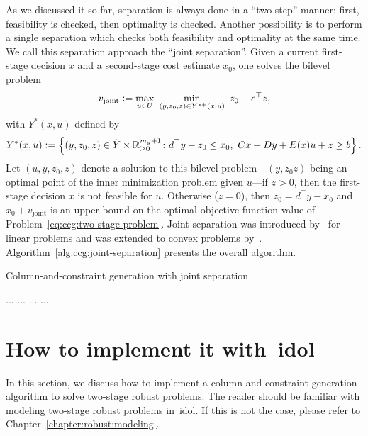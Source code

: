 As we discussed it so far, separation is always done in a ``two-step'' manner:
first, feasibility is checked, then optimality is checked. Another possibility
is to perform a single separation which checks both feasibility and optimality
at the same time. We call this separation approach the ``joint separation''.
Given a current first-stage decision $x$ and a second-stage cost estimate
$x_0$, one solves the bilevel problem 
\begin{equation*}
    v_\text{joint} \define \max_{u\in U} \ \min_{(y,z_0,z)\in Y^{*+}(x,u)} \ { z_0 + e^\top z },
\end{equation*}
with $Y^{*}(x,u)$ defined by
\begin{equation*}
    Y^{*}(x,u) \mathrel{{\mathop:}{=}} \left\{ (y,z_0,z)\in\tilde{Y}\times\mathbb{R}^{m_y+1}_{\ge 0} \colon d^\top y - z_0 \le x_0, \ Cx + Dy + E(x)u + z \ge b\right\}.
\end{equation*}
Let $(u,y,z_0,z)$ denote a solution to this bilevel problem---$(y,z_0z)$ being
an optimal point of the inner minimization problem given $u$---if $z > 0$,
then the first-stage decision $x$ is not feasible for $u$. Otherwise ($z=0$),
then $z_0 = d^\top y - x_0$ and $x_0 + v_\text{joint}$ is an upper bound on
the optimal objective function value of
Problem~\eqref{eq:ccg:two-stage-problem}. Joint separation was introduced
by~\textcite{Ayoub2016} for linear problems and was extended to convex
problems by~\textcite{lefebvre2022convex}.
Algorithm~\ref{alg:ccg:joint-separation} presents the overall algorithm.

\begin{algorithm}
    \caption{Column-and-constraint generation with joint separation}
    \label{alg:ccg:joint-separation}
    \begin{algorithmic}[1]
        \State ...
        \While {}
        \State ...
            \State ... 
        \EndIf
        \State ...
        \EndWhile
    \end{algorithmic}
\end{algorithm}

\section{How to implement it with~\textsf{idol}}

In this section, we discuss how to implement a column-and-constraint
generation algorithm to solve two-stage robust problems. The reader should be
familiar with modeling two-stage robust problems in~\textsf{idol}. If this is
not the case, please refer to Chapter~\ref{chapter:robust:modeling}. 

